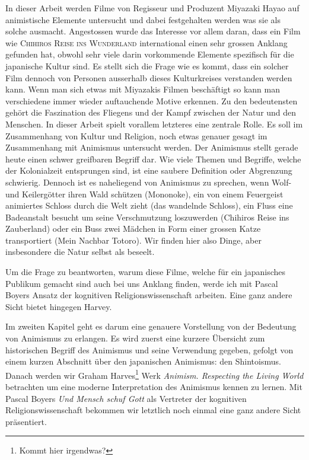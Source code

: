 In dieser Arbeit werden Filme von Regisseur und Produzent Miyazaki Hayao auf animistische Elemente untersucht und dabei festgehalten werden was sie als solche ausmacht.
Angestossen wurde das Interesse vor allem daran, dass ein Film wie \textsc{Chihiros Reise ins Wunderland} international einen sehr grossen Anklang gefunden hat, obwohl sehr viele darin vorkommende Elemente spezifisch für die japanische Kultur sind. Es stellt sich die Frage wie es kommt, dass ein solcher Film dennoch von Personen ausserhalb dieses Kulturkreises verstanden werden kann. Wenn man sich etwas mit Miyazakis Filmen beschäftigt so kann man verschiedene immer wieder auftauchende Motive erkennen. Zu den bedeutensten gehört die Faszination des Fliegens und der Kampf zwischen der Natur und den Menschen. In dieser Arbeit spielt vorallem letzteres eine zentrale Rolle. Es soll im Zusammenhang von Kultur und Religion, noch etwas genauer gesagt im Zusammenhang mit Animismus untersucht werden. Der Animismus stellt gerade heute einen schwer greifbaren Begriff dar. Wie viele Themen und Begriffe, welche der Kolonialzeit entsprungen sind, ist eine saubere Definition oder Abgrenzung schwierig. Dennoch ist es naheliegend von Animismus zu sprechen, wenn Wolf- und Keilergötter ihren Wald schützen (Mononoke), ein von einem Feuergeist animiertes Schloss durch die Welt zieht (das wandelnde Schloss), ein Fluss eine Badeanstalt besucht um seine Verschmutzung loszuwerden (Chihiros Reise ins Zauberland) oder ein Buss zwei Mädchen in Form einer grossen Katze transportiert (Mein Nachbar Totoro). Wir finden hier also Dinge, aber insbesondere die Natur selbst als beseelt. 

Um die Frage zu beantworten, warum diese Filme, welche für ein japanisches Publikum gemacht sind auch bei uns Anklang finden, werde ich mit Pascal Boyers Ansatz der kognitiven Religionswissenschaft arbeiten. Eine ganz andere Sicht bietet hingegen Harvey.

Im zweiten Kapitel geht es darum eine genauere Vorstellung von der Bedeutung von Animismus zu erlangen. Es wird zuerst eine kurzere Übersicht zum historischen Begriff des Animismus und seine Verwendung gegeben, gefolgt von einem kurzen Abschnitt über den japanischen Animismus: den Shintoismus. Danach werden wir Graham Harves\footnote{Kommt hier irgendwas?} Werk \emph{Animism. Respecting the Living World} betrachten um eine moderne Interpretation des Animismus kennen zu lernen. Mit Pascal Boyers \emph{Und Mensch schuf Gott} als Vertreter der kognitiven Religionswissenschaft bekommen wir letztlich noch einmal eine ganz andere Sicht präsentiert.

